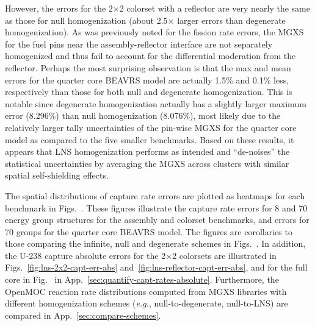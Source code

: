 However, the errors for the 2$\times$2 colorset with a reflector are very nearly the same as those for null homogenization (about 2.5$\times$ larger errors than degenerate homogenization). As was previously noted for the fission rate errors, the \ac{MGXS} for the fuel pins near the assembly-reflector interface are not separately homogenized and thus fail to account for the differential moderation from the reflector. Perhaps the most surprising observation is that the max and mean errors for the quarter core \ac{BEAVRS} model are actually 1.5\% and 0.1\% less, respectively than those for both null and degenerate homogenization. This is notable since degenerate homogenization actually has a slightly larger maximum error (8.296\%) than null homogenization (8.076\%), most likely due to the relatively larger tally uncertainties of the pin-wise \ac{MGXS} for the quarter core model as compared to the five smaller benchmarks. Based on these results, it appears that \ac{LNS} homogenization performs as intended and ``de-noises'' the statistical uncertainties by averaging the \ac{MGXS} across clusters with similar spatial self-shielding effects.

The spatial distributions of capture rate errors are plotted as heatmaps for each benchmark in Figs.~. These figures illustrate the capture rate errors for 8 and 70 energy group structures for the assembly and colorset benchmarks, and errors for 70 groups for the quarter core \ac{BEAVRS} model. The figures are corollaries to those comparing the infinite, null and degenerate schemes in Figs.~. In addition, the U-238 capture absolute errors for the 2$\times$2 colorsets are illustrated in Figs.~\ref{fig:lns-2x2-capt-err-abs} and~\ref{fig:lns-reflector-capt-err-abs}, and for the full core in Fig.~ in App.~\ref{sec:quantify-capt-rates-absolute}. Furthermore, the OpenMOC reaction rate distributions computed from \ac{MGXS} libraries with different homogenization schemes (\textit{e.g.}, null-to-degenerate, null-to-\ac{LNS}) are compared in App.~\ref{sec:compare-schemes}.

